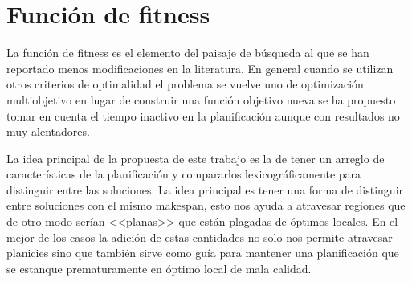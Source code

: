 \section{Función de fitness}\label{prop:fitness}
La función de fitness es el elemento del paisaje de búsqueda al que se han reportado menos modificaciones en la literatura. En general cuando se utilizan otros criterios de optimalidad el problema se vuelve uno de optimización multiobjetivo\cite{gong2019effective,sakawa2000fuzzy,ponnambalam2001multiobjective} en lugar de construir una función objetivo nueva se ha propuesto tomar en cuenta el tiempo inactivo en la planificación\cite{uckun1993managing} aunque con resultados no muy alentadores.   

La idea principal de la propuesta de este trabajo es la de tener un arreglo de características de la planificación y compararlos lexicográficamente para distinguir entre las soluciones. La idea principal es tener una forma de distinguir entre soluciones con el mismo makespan, esto nos ayuda a atravesar regiones que de otro modo serían <<planas>> que están plagadas de óptimos locales. En el mejor de los casos la adición de estas cantidades no solo nos permite atravesar planicies sino que también sirve como guía para mantener una planificación que se estanque prematuramente en óptimo local de mala calidad.\\

